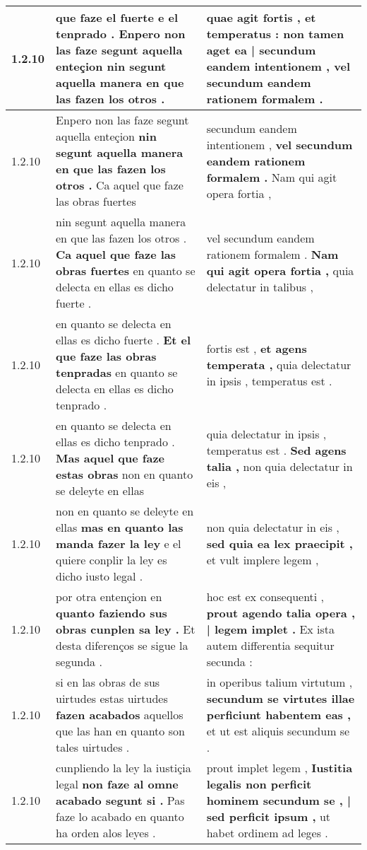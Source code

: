 \begin{tabular}{|p{1cm}|p{6.5cm}|p{6.5cm}|}
1.2.10 & que faze el fuerte e el tenprado . \textbf{ Enpero non las faze segunt aquella enteçion } nin segunt aquella manera en que las fazen los otros . & quae agit fortis , et temperatus : \textbf{ non tamen aget ea | secundum eandem intentionem , } vel secundum eandem rationem formalem . \\\hline
1.2.10 & Enpero non las faze segunt aquella enteçion \textbf{ nin segunt aquella manera en que las fazen los otros . } Ca aquel que faze las obras fuertes & secundum eandem intentionem , \textbf{ vel secundum eandem rationem formalem . } Nam qui agit opera fortia , \\\hline
1.2.10 & nin segunt aquella manera en que las fazen los otros . \textbf{ Ca aquel que faze las obras fuertes } en quanto se delecta en ellas es dicho fuerte . & vel secundum eandem rationem formalem . \textbf{ Nam qui agit opera fortia , } quia delectatur in talibus , \\\hline
1.2.10 & en quanto se delecta en ellas es dicho fuerte . \textbf{ Et el que faze las obras tenpradas } en quanto se delecta en ellas es dicho tenprado . & fortis est , \textbf{ et agens temperata , } quia delectatur in ipsis , temperatus est . \\\hline
1.2.10 & en quanto se delecta en ellas es dicho tenprado . \textbf{ Mas aquel que faze estas obras } non en quanto se deleyte en ellas & quia delectatur in ipsis , temperatus est . \textbf{ Sed agens talia , } non quia delectatur in eis , \\\hline
1.2.10 & non en quanto se deleyte en ellas \textbf{ mas en quanto las manda fazer la ley } e el quiere conplir la ley es dicho iusto legal . & non quia delectatur in eis , \textbf{ sed quia ea lex praecipit , } et vult implere legem , \\\hline
1.2.10 & por otra entençion en \textbf{ quanto faziendo sus obras cunplen sa ley . } Et desta diferenços se sigue la segunda . & hoc est ex consequenti , \textbf{ prout agendo talia opera , | legem implet . } Ex ista autem differentia sequitur secunda : \\\hline
1.2.10 & si en las obras de sus uirtudes estas uirtudes \textbf{ fazen acabados } aquellos que las han en quanto son tales uirtudes . & in operibus talium virtutum , \textbf{ secundum se virtutes illae perficiunt habentem eas , } et ut est aliquis secundum se . \\\hline
1.2.10 & cunpliendo la ley la iustiçia legal \textbf{ non faze al omne acabado segunt si . } Pas faze lo acabado en quanto ha orden alos leyes . & prout implet legem , \textbf{ Iustitia legalis non perficit hominem secundum se , | sed perficit ipsum , } ut habet ordinem ad leges . \\\hline

\end{tabular}
